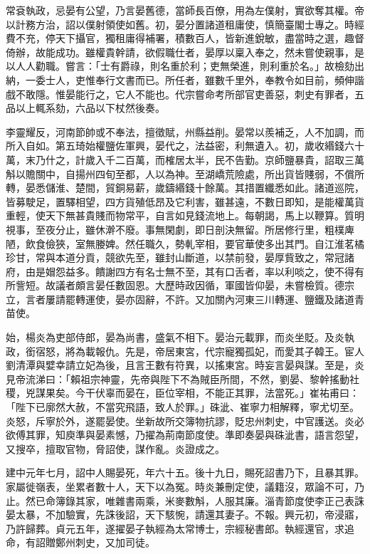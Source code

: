 \begin{pinyinscope}
 常袞執政，忌晏有公望，乃言晏舊德，當師長百僚，用為左僕射，實欲奪其權。帝以計務方治，詔以僕射領使如舊。初，晏分置諸道租庸使，慎簡臺閣士專之。時經費不充，停天下攝官，獨租庸得補署，積數百人，皆新進銳敏，盡當時之選，趣督倚辦，故能成功。雖權貴幹請，欲假職仕者，晏厚以稟入奉之，然未嘗使親事，是以人人勸職。嘗言：「士有爵祿，則名重於利；吏無榮進，則利重於名。」故檢劾出納，一委士人，吏惟奉行文書而已。所任者，雖數千里外，奉教令如目前，頻伸諧戲不敢隱。惟晏能行之，它人不能也。代宗嘗命考所部官吏善惡，刺史有罪者，五品以上輒系劾，六品以下杖然後奏。



 李靈耀反，河南節帥或不奉法，擅徵賦，州縣益削。晏常以羨補乏，人不加調，而所入自如。第五琦始權鹽佐軍興，晏代之，法益密，利無遺入。初，歲收緡錢六十萬，末乃什之，計歲入千二百萬，而榷居太半，民不告勤。京師鹽暴貴，詔取三萬斛以贍關中，自揚州四旬至都，人以為神。至湖嶠荒險處，所出貨皆賤弱，不償所轉，晏悉儲淮、楚間，貿銅易薪，歲鑄緡錢十餘萬。其措置纖悉如此。諸道巡院，皆募駛足，置驛相望，四方貨殖低昂及它利害，雖甚遠，不數日即知，是能權萬貨重輕，使天下無甚貴賤而物常平，自言如見錢流地上。每朝謁，馬上以鞭算。質明視事，至夜分止，雖休澣不廢。事無閑劇，即日剖決無留。所居修行里，粗樸庳陋，飲食儉狹，室無媵婢。然任職久，勢軋宰相，要官華使多出其門。自江淮茗橘珍甘，常與本道分貢，競欲先至，雖封山斷道，以禁前發，晏厚貲致之，常冠諸府，由是媢怨益多。饋謝四方有名士無不至，其有口舌者，率以利啖之，使不得有所訾短。故議者頗言晏任數固恩。大歷時政因循，軍國皆仰晏，未嘗檢質。德宗立，言者屢請罷轉運使，晏亦固辭，不許。又加關內河東三川轉運、鹽鐵及諸道青苗使。



 始，楊炎為吏部侍郎，晏為尚書，盛氣不相下。晏治元載罪，而炎坐貶。及炎執政，銜宿怒，將為載報仇。先是，帝居東宮，代宗寵獨孤妃，而愛其子韓王。宦人劉清潭與嬖幸請立妃為後，且言王數有符異，以搖東宮。時妄言晏與謀。至是，炎見帝流涕曰：「賴祖宗神靈，先帝與陛下不為賊臣所間，不然，劉晏、黎幹搖動社稷，兇謀果矣。今干伏辜而晏在，臣位宰相，不能正其罪，法當死。」崔祐甫曰：「陛下已廓然大赦，不當究飛語，致人於罪。」硃泚、崔寧力相解釋，寧尤切至。炎怒，斥寧於外，遂罷晏使。坐新故所交簿物抗謬，貶忠州刺史，中官護送。炎必欲傅其罪，知庾準與晏素憾，乃擢為荊南節度使。準即奏晏與硃泚書，語言怨望，又搜卒，擅取官物，脅詔使，謀作亂。炎證成之。



 建中元年七月，詔中人賜晏死，年六十五。後十九日，賜死詔書乃下，且暴其罪。家屬徙嶺表，坐累者數十人，天下以為冤。時炎兼刪定使，議籍沒，眾論不可，乃止。然已命簿錄其家，唯雜書兩乘，米麥數斛，人服其廉。淄青節度使李正己表誅晏太暴，不加驗實，先誅後詔，天下駭惋，請還其妻子。不報。興元初，帝浸寤，乃許歸葬。貞元五年，遂擢晏子執經為太常博士，宗經秘書郎。執經還官，求追命，有詔贈鄭州刺史，又加司徒。




\end{pinyinscope}

